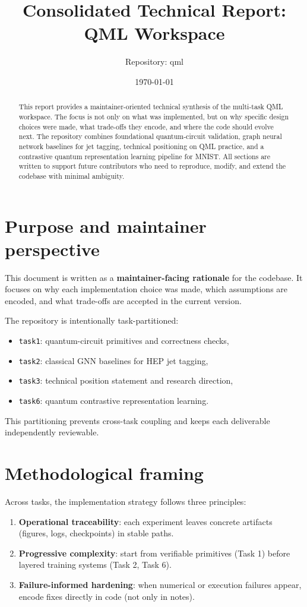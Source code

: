 \documentclass[11pt]{article}
\title{Consolidated Technical Report: QML Workspace}
\author{Repository: qml}
\date{\today}
\begin{document}
\maketitle

\begin{abstract}
This report provides a maintainer-oriented technical synthesis of the multi-task QML workspace. The focus is not only on what was implemented, but on why specific design choices were made, what trade-offs they encode, and where the code should evolve next. The repository combines foundational quantum-circuit validation, graph neural network baselines for jet tagging, technical positioning on QML practice, and a contrastive quantum representation learning pipeline for MNIST. All sections are written to support future contributors who need to reproduce, modify, and extend the codebase with minimal ambiguity.
\end{abstract}

\section{Purpose and maintainer perspective}
This document is written as a \textbf{maintainer-facing rationale} for the codebase.
It focuses on why each implementation choice was made, which assumptions are encoded,
and what trade-offs are accepted in the current version.

The repository is intentionally task-partitioned:
\begin{itemize}[leftmargin=1.3em]
    \item \texttt{task1}: quantum-circuit primitives and correctness checks,
    \item \texttt{task2}: classical GNN baselines for HEP jet tagging,
    \item \texttt{task3}: technical position statement and research direction,
    \item \texttt{task6}: quantum contrastive representation learning.
\end{itemize}
This partitioning prevents cross-task coupling and keeps each deliverable independently reviewable.

\section{Methodological framing}
Across tasks, the implementation strategy follows three principles:
\begin{enumerate}[leftmargin=1.3em]
    \item \textbf{Operational traceability}: each experiment leaves concrete artifacts (figures, logs, checkpoints) in stable paths.
    \item \textbf{Progressive complexity}: start from verifiable primitives (Task 1) before layered training systems (Task 2, Task 6).
    \item \textbf{Failure-informed hardening}: when numerical or execution failures appear, encode fixes directly in code (not only in notes).
\end{enumerate}
\end{document}
